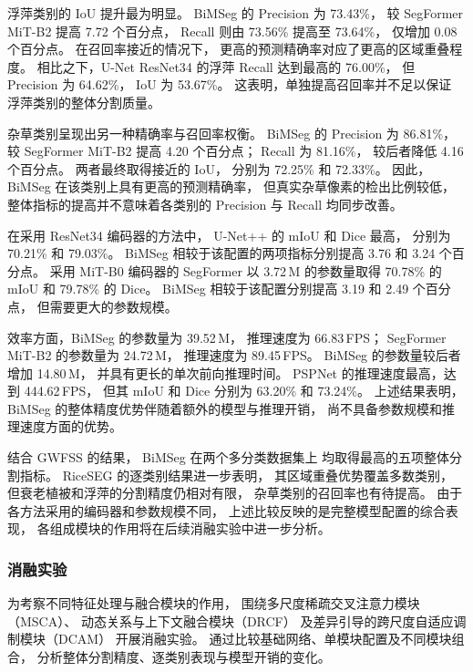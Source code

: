 浮萍类别的 IoU 提升最为明显。
BiMSeg 的 Precision 为 73.43\%，
较 SegFormer MiT-B2 提高 7.72 个百分点，
Recall 则由 73.56\% 提高至 73.64\%，
仅增加 0.08 个百分点。
在召回率接近的情况下，
更高的预测精确率对应了更高的区域重叠程度。
相比之下，U-Net ResNet34 的浮萍 Recall
达到最高的 76.00\%，
但 Precision 为 64.62\%，
IoU 为 53.67\%。
这表明，单独提高召回率并不足以保证
浮萍类别的整体分割质量。

杂草类别呈现出另一种精确率与召回率权衡。
BiMSeg 的 Precision 为 86.81\%，
较 SegFormer MiT-B2 提高 4.20 个百分点；
Recall 为 81.16\%，
较后者降低 4.16 个百分点。
两者最终取得接近的 IoU，
分别为 72.25\% 和 72.33\%。
因此，BiMSeg 在该类别上具有更高的预测精确率，
但真实杂草像素的检出比例较低，
整体指标的提高并不意味着各类别的
Precision 与 Recall 均同步改善。

在采用 ResNet34 编码器的方法中，
U-Net++ 的 mIoU 和 Dice 最高，
分别为 70.21\% 和 79.03\%。
BiMSeg 相较于该配置的两项指标分别提高
3.76 和 3.24 个百分点。
采用 MiT-B0 编码器的 SegFormer
以 3.72\,M 的参数量取得
70.78\% 的 mIoU 和 79.78\% 的 Dice。
BiMSeg 相较于该配置分别提高
3.19 和 2.49 个百分点，
但需要更大的参数规模。

效率方面，BiMSeg 的参数量为 39.52\,M，
推理速度为 66.83\,FPS；
SegFormer MiT-B2 的参数量为 24.72\,M，
推理速度为 89.45\,FPS。
BiMSeg 的参数量较后者增加 14.80\,M，
并具有更长的单次前向推理时间。
PSPNet 的推理速度最高，达到 444.62\,FPS，
但其 mIoU 和 Dice 分别为 63.20\% 和 73.24\%。
上述结果表明，
BiMSeg 的整体精度优势伴随着额外的模型与推理开销，
尚不具备参数规模和推理速度方面的优势。

结合 GWFSS 的结果，
BiMSeg 在两个多分类数据集上
均取得最高的五项整体分割指标。
RiceSEG 的逐类别结果进一步表明，
其区域重叠优势覆盖多数类别，
但衰老植被和浮萍的分割精度仍相对有限，
杂草类别的召回率也有待提高。
由于各方法采用的编码器和参数规模不同，
上述比较反映的是完整模型配置的综合表现，
各组成模块的作用将在后续消融实验中进一步分析。






\subsubsection{消融实验}
\label{sec:exp-ablation}

为考察不同特征处理与融合模块的作用，
围绕多尺度稀疏交叉注意力模块（MSCA）、
动态关系与上下文融合模块（DRCF）
及差异引导的跨尺度自适应调制模块（DCAM）
开展消融实验。
通过比较基础网络、单模块配置及不同模块组合，
分析整体分割精度、逐类别表现与模型开销的变化。

